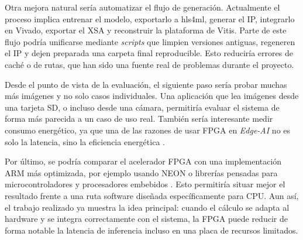 Otra mejora natural sería automatizar el flujo de generación. Actualmente el proceso implica
entrenar el modelo, exportarlo a hls4ml, generar el \ac{IP}, integrarlo en Vivado,
exportar el \ac{XSA} y
reconstruir la plataforma de Vitis. Parte de este flujo podría unificarse mediante
\textit{scripts} que
limpien versiones antiguas, regeneren el \ac{IP} y dejen preparada una carpeta final reproducible.
Esto reduciría errores de caché o de rutas, que han sido una fuente real de problemas durante el
proyecto.

Desde el punto de vista de la evaluación, el siguiente paso sería probar muchas más imágenes y no
solo casos individuales. Una aplicación que lea imágenes desde una tarjeta \ac{SD}, o
incluso desde una
cámara, permitiría evaluar el sistema de forma más parecida a un caso de uso real. También sería
interesante medir consumo energético, ya que una de las razones de usar \ac{FPGA} en
\textit{Edge-AI} no es solo
la latencia, sino la eficiencia energética \citep{sze2017efficientprocessingdeepneural}.

Por último, se podría comparar el acelerador \ac{FPGA} con una implementación \ac{ARM}
más optimizada, por
ejemplo usando NEON o librerías pensadas para microcontroladores y procesadores embebidos
\citep{lai2018cmsisnnefficientneuralnetwork}. Esto
permitiría situar mejor el resultado frente a una ruta software diseñada específicamente
para \ac{CPU}.
Aun así, el trabajo realizado ya muestra la idea principal: cuando el cálculo se adapta al hardware
y se integra correctamente con el sistema, la \ac{FPGA} puede reducir de forma notable la
latencia de
inferencia incluso en una placa de recursos limitados.
